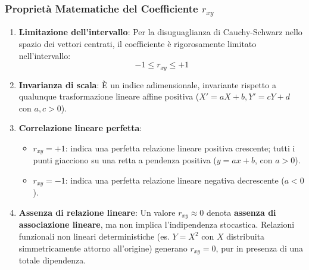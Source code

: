 \subsubsection{Proprietà Matematiche del Coefficiente $r_{xy}$}
\begin{enumerate}
    \item \textbf{Limitazione dell'intervallo}: Per la disuguaglianza di Cauchy-Schwarz nello spazio dei vettori centrati, il coefficiente è rigorosamente limitato nell'intervallo:
    \begin{equation}
        -1 \le r_{xy} \le +1
    \end{equation}
    \item \textbf{Invarianza di scala}: È un indice adimensionale, invariante rispetto a qualunque trasformazione lineare affine positiva ($X' = aX + b, Y' = cY + d$ con $a, c > 0$).
    \item \textbf{Correlazione lineare perfetta}:
    \begin{itemize}
        \item $r_{xy} = +1$: indica una perfetta relazione lineare positiva crescente; tutti i punti giacciono su una retta a pendenza positiva ($y = ax + b$, con $a > 0$).
        \item $r_{xy} = -1$: indica una perfetta relazione lineare negativa decrescente ($a < 0$).
    \end{itemize}
    \item \textbf{Assenza di relazione lineare}: Un valore $r_{xy} \approx 0$ denota \textbf{assenza di associazione lineare}, ma non implica l'indipendenza stocastica. Relazioni funzionali non lineari deterministiche (es. $Y = X^2$ con $X$ distribuita simmetricamente attorno all'origine) generano $r_{xy} = 0$, pur in presenza di una totale dipendenza.
\end{enumerate}

